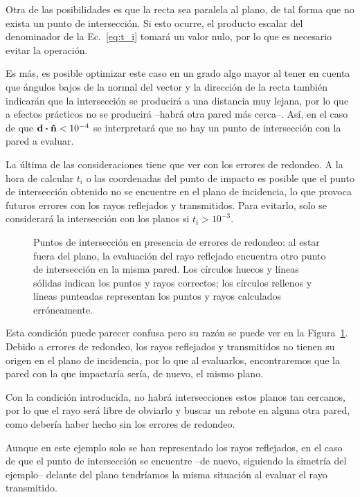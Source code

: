 Otra de las posibilidades es que la recta sea paralela al plano, de tal forma que no exista un punto de intersección.
Si esto ocurre, el producto escalar del denominador de la Ec.~\eqref{eq:t_i} tomará un valor nulo, por lo que es necesario evitar la operación.

Es más, es posible optimizar este caso en un grado algo mayor al tener en cuenta que ángulos bajos de la normal del vector y la dirección de la recta también indicarán que la intersección se producirá a una distancia muy lejana, por lo que a efectos prácticos no se producirá --habrá otra pared más cerca--.
Así, en el caso de que $\vb{d}\vdot\vu{n} < 10^{-4}$ se interpretará que no hay un punto de intersección con la pared a evaluar.

La última de las consideraciones tiene que ver con los errores de redondeo.
A la hora de calcular $t_i$ o las coordenadas del punto de impacto es posible que el punto de intersección obtenido no se encuentre en el plano de incidencia, lo que provoca futuros errores con los rayos reflejados y transmitidos.
Para evitarlo, solo se considerará la intersección con los planos si $t_i > 10^{-3}$.

\begin{figure}[H]
    \centering
    
    \caption{Puntos de intersección en presencia de errores de redondeo: al estar fuera del plano, la evaluación del rayo reflejado encuentra otro punto de intersección en la misma pared. Los círculos huecos y líneas sólidas indican los puntos y rayos correctos; los círculos rellenos y líneas punteadas representan los puntos y rayos calculados erróneamente.}
    \label{fig:condicion_interseccion}
\end{figure}

Esta condición puede parecer confusa pero su razón se puede ver en la Figura~\ref{fig:condicion_interseccion}.
Debido a errores de redondeo, los rayos reflejados y transmitidos no tienen su origen en el plano de incidencia, por lo que al evaluarlos, encontraremos que la pared con la que impactaría sería, de nuevo, el mismo plano.

Con la condición introducida, no habrá intersecciones estos planos tan cercanos, por lo que el rayo será libre de obviarlo y buscar un rebote en alguna otra pared, como debería haber hecho sin los errores de redondeo.

Aunque en este ejemplo solo se han representado los rayos reflejados, en el caso de que el punto de intersección se encuentre --de nuevo, siguiendo la simetría del ejemplo-- delante del plano tendríamos la misma situación al evaluar el rayo transmitido.

